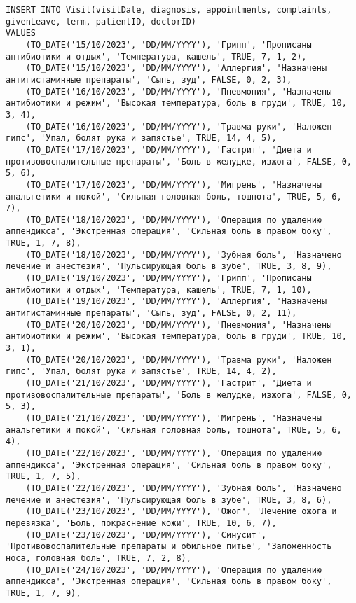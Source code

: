 \documentclass{article}
\begin{document}
{\begin{verbatim}
INSERT INTO Visit(visitDate, diagnosis, appointments, complaints, givenLeave, term, patientID, doctorID)
VALUES 
    (TO_DATE('15/10/2023', 'DD/MM/YYYY'), 'Грипп', 'Прописаны антибиотики и отдых', 'Температура, кашель', TRUE, 7, 1, 2),
    (TO_DATE('15/10/2023', 'DD/MM/YYYY'), 'Аллергия', 'Назначены антигистаминные препараты', 'Сыпь, зуд', FALSE, 0, 2, 3),
    (TO_DATE('16/10/2023', 'DD/MM/YYYY'), 'Пневмония', 'Назначены антибиотики и режим', 'Высокая температура, боль в груди', TRUE, 10, 3, 4),
    (TO_DATE('16/10/2023', 'DD/MM/YYYY'), 'Травма руки', 'Наложен гипс', 'Упал, болят рука и запястье', TRUE, 14, 4, 5),
    (TO_DATE('17/10/2023', 'DD/MM/YYYY'), 'Гастрит', 'Диета и противовоспалительные препараты', 'Боль в желудке, изжога', FALSE, 0, 5, 6),
    (TO_DATE('17/10/2023', 'DD/MM/YYYY'), 'Мигрень', 'Назначены анальгетики и покой', 'Сильная головная боль, тошнота', TRUE, 5, 6, 7),
    (TO_DATE('18/10/2023', 'DD/MM/YYYY'), 'Операция по удалению аппендикса', 'Экстренная операция', 'Сильная боль в правом боку', TRUE, 1, 7, 8),
    (TO_DATE('18/10/2023', 'DD/MM/YYYY'), 'Зубная боль', 'Назначено лечение и анестезия', 'Пульсирующая боль в зубе', TRUE, 3, 8, 9),
    (TO_DATE('19/10/2023', 'DD/MM/YYYY'), 'Грипп', 'Прописаны антибиотики и отдых', 'Температура, кашель', TRUE, 7, 1, 10),
    (TO_DATE('19/10/2023', 'DD/MM/YYYY'), 'Аллергия', 'Назначены антигистаминные препараты', 'Сыпь, зуд', FALSE, 0, 2, 11),
    (TO_DATE('20/10/2023', 'DD/MM/YYYY'), 'Пневмония', 'Назначены антибиотики и режим', 'Высокая температура, боль в груди', TRUE, 10, 3, 1),
    (TO_DATE('20/10/2023', 'DD/MM/YYYY'), 'Травма руки', 'Наложен гипс', 'Упал, болят рука и запястье', TRUE, 14, 4, 2),
    (TO_DATE('21/10/2023', 'DD/MM/YYYY'), 'Гастрит', 'Диета и противовоспалительные препараты', 'Боль в желудке, изжога', FALSE, 0, 5, 3),
    (TO_DATE('21/10/2023', 'DD/MM/YYYY'), 'Мигрень', 'Назначены анальгетики и покой', 'Сильная головная боль, тошнота', TRUE, 5, 6, 4),
    (TO_DATE('22/10/2023', 'DD/MM/YYYY'), 'Операция по удалению аппендикса', 'Экстренная операция', 'Сильная боль в правом боку', TRUE, 1, 7, 5),
    (TO_DATE('22/10/2023', 'DD/MM/YYYY'), 'Зубная боль', 'Назначено лечение и анестезия', 'Пульсирующая боль в зубе', TRUE, 3, 8, 6),
    (TO_DATE('23/10/2023', 'DD/MM/YYYY'), 'Ожог', 'Лечение ожога и перевязка', 'Боль, покраснение кожи', TRUE, 10, 6, 7),
    (TO_DATE('23/10/2023', 'DD/MM/YYYY'), 'Синусит', 'Противовоспалительные препараты и обильное питье', 'Заложенность носа, головная боль', TRUE, 7, 2, 8),
    (TO_DATE('24/10/2023', 'DD/MM/YYYY'), 'Операция по удалению аппендикса', 'Экстренная операция', 'Сильная боль в правом боку', TRUE, 1, 7, 9),

\end{verbatim}}
\end{document}
